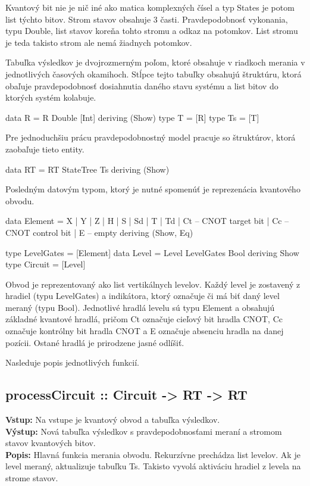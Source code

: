 Kvantový bit nie je nič iné ako matica komplexných čísel a typ States je potom
list týchto bitov. Strom stavov obsahuje 3 časti. Pravdepodobnosť vykonania,
typu Double, list stavov koreňa tohto stromu a odkaz na potomkov. List stromu
je teda takisto strom ale nemá žiadnych potomkov.

Tabuľka výsledkov je dvojrozmerným poľom, ktoré obsahuje v riadkoch merania 
v jednotlivých časových okamihoch. Stĺpce tejto tabuľky obsahujú štruktúru, 
ktorá obaľuje pravdepodobnosť dosiahnutia daného stavu systému a list bitov 
do ktorých systém kolabuje.
\begin{code}
data R = R Double [Int]
    deriving (Show)
type T = [R]
type Ts = [T]
\end{code}

Pre jednoduchšiu prácu pravdepodobnostný model pracuje so štruktúrov, ktorá 
zaobaľuje tieto entity.
\begin{code}
data RT = RT StateTree Ts
    deriving (Show)
\end{code}

Posledným datovým typom, ktorý je nutné spomenúť je reprezenácia kvantového
obvodu.
\begin{code}
data Element = X
    | Y
    | Z
    | H
    | S
    | Sd
    | T
    | Td
    | Ct   -- CNOT target bit
    | Cc  -- CNOT control bit
    | E   -- empty
    deriving (Show, Eq)

type LevelGates = [Element]
data Level = Level LevelGates Bool deriving Show
type Circuit = [Level]
\end{code}

Obvod je reprezentovaný ako list vertikálnych levelov. Každý level je zostavený
z hradiel (typu LevelGates) a indikátora, ktorý označuje či má biť daný level
meraný (typu Bool). Jednotlivé hradlá levelu sú typu Element a obsahujú
základné kvantové hradlá, pričom Ct označuje cieľový bit hradla CNOT, Cc 
označuje kontrólny bit hradla CNOT a E označuje absenciu hradla na danej
pozícii. Ostané hradlá je prirodzene jasné odlíšiť.

Nasleduje popis jednotlivých funkcií.

\subsection*{processCircuit :: Circuit -> RT -> RT }
\textbf{Vstup:} Na vstupe je kvantový obvod a tabuľka výsledkov.\\
\textbf{Výstup:} Nová tabuľka výsledkov s pravdepodobnosťami meraní a stromom
stavov kvantových bitov. \\
\textbf{Popis:}
Hlavná funkcia merania obvodu. Rekurzívne prechádza list levelov. Ak je 
level meraný, aktualizuje tabuľku Ts. Takisto vyvolá aktiváciu hradiel z 
levela na strome stavov.

